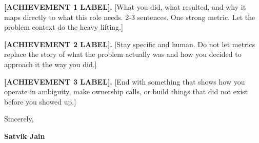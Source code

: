 \documentclass[a4paper,10pt]{article}
\begin{document}
%

\vspace{0.12in}

\noindent
{\textcolor{csection}{\textbf{[ACHIEVEMENT 1 LABEL].}}}
[What you did, what resulted, and why it maps directly to what this role needs.
2-3 sentences. One strong metric. Let the problem context do the heavy lifting.]

\vspace{0.12in}

\noindent
{\textcolor{csection}{\textbf{[ACHIEVEMENT 2 LABEL].}}}
[Stay specific and human. Do not let metrics replace the story of what the problem
actually was and how you decided to approach it the way you did.]

\vspace{0.12in}

\noindent
{\textcolor{csection}{\textbf{[ACHIEVEMENT 3 LABEL].}}}
[End with something that shows how you operate in ambiguity, make ownership calls,
or build things that did not exist before you showed up.]

\vspace{0.2in}

%

\vspace{0.2in}

%

\vspace{0.3in}

\noindent
Sincerely,

\vspace{0.35in}


\noindent
\textbf{Satvik Jain}
\end{document}
